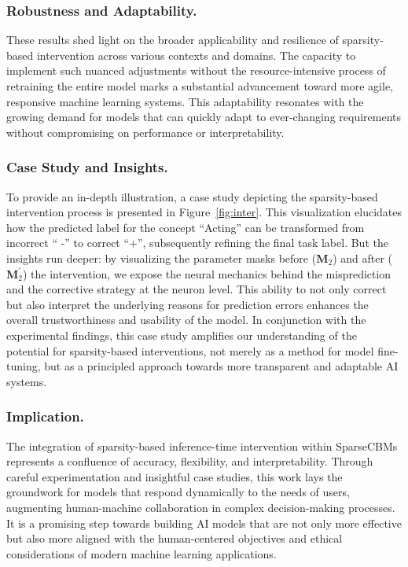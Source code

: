 \documentclass[letterpaper]{article} %
\begin{document}
\subsubsection{Robustness and Adaptability.}
These results shed light on the broader applicability and resilience of sparsity-based intervention across various contexts and domains. The capacity to implement such nuanced adjustments without the resource-intensive process of retraining the entire model marks a substantial advancement toward more agile, responsive machine learning systems. This adaptability resonates with the growing demand for models that can quickly adapt to ever-changing requirements without compromising on performance or interpretability.

\subsubsection{Case Study and Insights.}
To provide an in-depth illustration, a case study depicting the sparsity-based intervention process is presented in Figure~\ref{fig:inter}. This visualization elucidates how the predicted label for the concept ``Acting'' can be transformed from incorrect `` -'' to correct ``+'', subsequently refining the final task label. But the insights run deeper: by visualizing the parameter masks before ($\bm{M}_2$) and after ($\bm{M}_2^\prime$) the intervention, we expose the neural mechanics behind the misprediction and the corrective strategy at the neuron level.
This ability to not only correct but also interpret the underlying reasons for prediction errors enhances the overall trustworthiness and usability of the model. In conjunction with the experimental findings, this case study amplifies our understanding of the potential for sparsity-based interventions, not merely as a method for model fine-tuning, but as a principled approach towards more transparent and adaptable AI systems.

\subsubsection{Implication.}
The integration of sparsity-based inference-time intervention within SparseCBMs represents a confluence of accuracy, flexibility, and interpretability. Through careful experimentation and insightful case studies, this work lays the groundwork for models that respond dynamically to the needs of users, augmenting human-machine collaboration in complex decision-making processes. It is a promising step towards building AI models that are not only more effective but also more aligned with the human-centered objectives and ethical considerations of modern machine learning applications.
\end{document}
